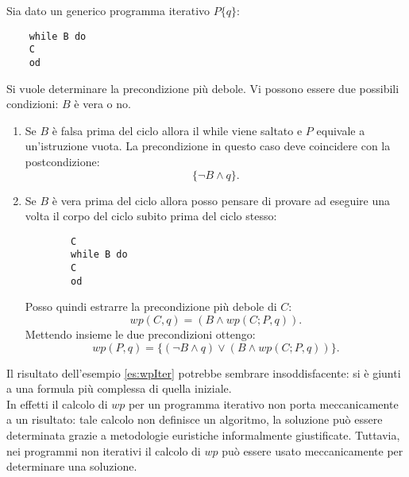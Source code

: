 \begin{es}
	\label{es:wpIter}
	Sia dato un generico programma iterativo $P\{q\}$:
	\begin{lstlisting}
	while B do
	C
	od
	\end{lstlisting}
	Si vuole determinare la precondizione pi\`u debole.
	Vi possono essere due possibili condizioni: $B$ \`e vera o no. 
	\begin{enumerate}
		\item Se $B$ \`e falsa prima del ciclo allora il while viene saltato e $P$ equivale a un'istruzione vuota. La precondizione in questo caso deve coincidere con la postcondizione: $$\{\neg B \land q \}.$$
		\item Se $B$ \`e vera prima del ciclo allora posso pensare di provare ad eseguire una volta il corpo del ciclo subito prima del ciclo stesso:
		\begin{lstlisting}
		C
		while B do
		C
		od
		\end{lstlisting}
		Posso quindi estrarre la precondizione pi\`u debole di $C$: $$wp(C, q) = (B \land wp(C;P,q)).$$
		Mettendo insieme le due precondizioni ottengo: $$wp(P, q)=\{(\neg B \land q )  \lor (B \land wp(C;P,q))\}.$$
	\end{enumerate}
\end{es}
Il risultato dell'esempio \ref{es:wpIter} potrebbe sembrare insoddisfacente: si \`e giunti a una formula pi\`u complessa di quella iniziale. \\
In effetti il calcolo di $wp$ per un programma iterativo non porta meccanicamente a un risultato: tale calcolo non definisce un algoritmo, la soluzione pu\`o essere determinata grazie a metodologie euristiche informalmente giustificate. Tuttavia, nei programmi non iterativi il calcolo di $wp$ pu\`o essere usato meccanicamente per determinare una soluzione.